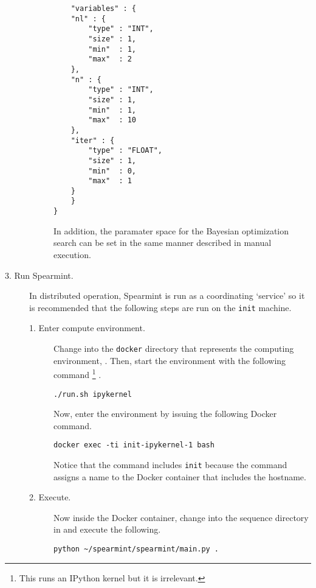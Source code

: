 \begin{description}
\begin{description}
\begin{verbatim}
    "variables" : {
	"nl" : {
	    "type" : "INT",
	    "size" : 1,
	    "min"  : 1,
	    "max"  : 2
	},
	"n" : {
	    "type" : "INT",
	    "size" : 1,
	    "min"  : 1,
	    "max"  : 10
	},
	"iter" : {
	    "type" : "FLOAT",
	    "size" : 1,
	    "min"  : 0,
	    "max"  : 1
	}
    }
}
\end{verbatim}

    In addition, the paramater space for the Bayesian optimization search can be set in the same manner described in manual execution.
  

\end{description}

\item[3. Run Spearmint.] \hfill

  In distributed operation, \textsf{Spearmint} is run as a coordinating `service' so it is recommended that the following steps are run on the \texttt{init} machine.
 
\begin{description}


\item[1. Enter compute environment.] \hfill

  Change into the \texttt{docker} directory that represents the computing environment, .
  Then, start the environment with the following command%
  \footnote{This runs an \textsf{IPython} kernel but it is irrelevant.}%
  .

\begin{verbatim}
./run.sh ipykernel
\end{verbatim}
%
Now, enter the environment by issuing the following \textsf{Docker} command.

%
\begin{verbatim}
docker exec -ti init-ipykernel-1 bash
\end{verbatim}
%
Notice that the command includes \texttt{init} because the  command assigns a name to the \textsf{Docker} container that includes the hostname.


\item[2. Execute.] \hfill

  Now inside the \textsf{Docker} container, change into the sequence directory in  and execute the following.

\begin{verbatim}
python ~/spearmint/spearmint/main.py .
\end{verbatim}



\end{description}
\end{description}
